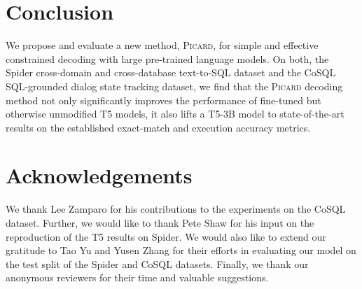 \documentclass[11pt]{article}
\newcommand{\Picard}{\textsc{Picard}}
\newcommand{\texttosql}{text-to-SQL}
\begin{document}
\section{Conclusion}

We propose and evaluate a new method, \Picard{},
for simple and effective constrained decoding with large pre-trained language models.
On both, the Spider cross-domain and cross-database \texttosql{} dataset
and the CoSQL SQL-grounded dialog state tracking dataset,
we find that the \Picard{} decoding method not only significantly improves
the performance of fine-tuned but otherwise unmodified T5 models,
it also lifts a T5-3B model to state-of-the-art results
on the established exact-match and execution accuracy metrics.

\section*{Acknowledgements}

We thank Lee Zamparo for his contributions to the experiments on the CoSQL dataset.
Further, we would like to thank Pete Shaw
for his input on the reproduction of the T5 results on Spider.
We would also like to extend our gratitude to Tao Yu and Yusen Zhang for their
efforts in evaluating our model on the test split of the Spider
and CoSQL datasets.
Finally, we thank our anonymous reviewers for their time and valuable suggestions.



\end{document}
